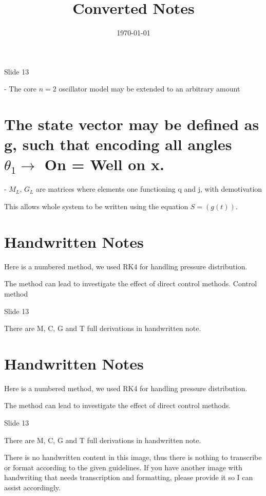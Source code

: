 \documentclass[12pt, a4paper]{article}
\title{Converted Notes}
\author{}
\date{\today}
\begin{document}
\maketitle
Slide 13

- The core \( n=2 \) oscillator model may be extended to an arbitrary amount

\section{The state vector may be defined as g, such that encoding all angles $\theta_1 \rightarrow$ On = Well on x.}

- $M_L$, $G_L$ are matrices where elements one functioning q and j,
  with demotivation

This allows whole system to be written using the equation \( S = (g(t)) \).

\section{Handwritten Notes}
Here is a numbered method, we used RK4 for handling pressure distribution.

The method can lead to investigate the effect of direct control methods.
Control method

Slide 13

There are M, C, G and T full derivations in handwritten note.

\section{Handwritten Notes}
Here is a numbered method, we used RK4 for handling pressure distribution.

The method can lead to investigate the effect of direct control methods.

Slide 13

There are M, C, G and T full derivations in handwritten note.

There is no handwritten content in this image, thus there is nothing to transcribe or format according to the given guidelines. If you have another image with handwriting that needs transcription and formatting, please provide it so I can assist accordingly.
\end{document}
